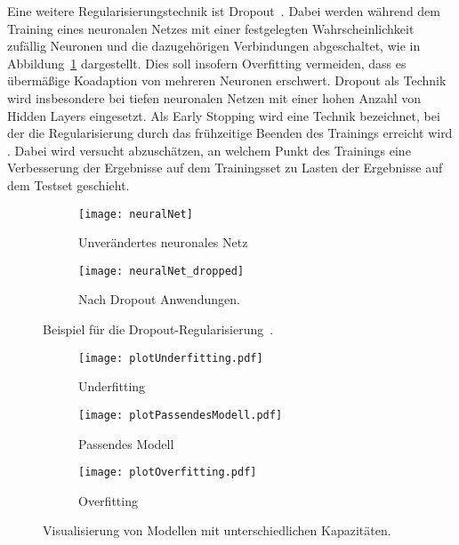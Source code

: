 
Eine weitere Regularisierungstechnik ist Dropout~\cite{JMLR:v15:srivastava14a}.
Dabei werden während dem Training eines neuronalen Netzes 
mit einer festgelegten Wahrscheinlichkeit zufällig Neuronen und die dazugehörigen Verbindungen abgeschaltet, 
wie in Abbildung~\ref{fig:dropout} dargestellt.
Dies soll insofern Overfitting vermeiden, dass es übermäßige Koadaption von mehreren Neuronen erschwert.
Dropout als Technik wird insbesondere bei tiefen neuronalen Netzen mit einer hohen Anzahl von Hidden Layers eingesetzt. 
Als Early Stopping wird eine Technik bezeichnet, bei der die Regularisierung durch das frühzeitige Beenden des Trainings erreicht wird \cite[Kapitel 7.8]{Goodfellow-et-al-2016}.
Dabei wird versucht abzuschätzen, an welchem Punkt des Trainings 
eine Verbesserung der Ergebnisse auf dem Trainingsset zu Lasten der Ergebnisse auf dem Testset geschieht.


\begin{figure}
    \centering
    \begin{subfigure}[t]{0.4\textwidth}
		\texttt{[image: neuralNet]}
		\caption{Unverändertes neuronales Netz}
    \end{subfigure}
    \begin{subfigure}[t]{0.4\textwidth}
		\texttt{[image: neuralNet\_dropped]}
		\caption{Nach Dropout Anwendungen.}
	\end{subfigure}
    \caption{Beispiel für die Dropout-Regularisierung~\cite{JMLR:v15:srivastava14a}.}
    \label{fig:dropout}
\end{figure}


\begin{figure}
    \centering
	
	\begin{subfigure}[t]{0.6\textwidth}
		\texttt{[image: plotUnderfitting.pdf]}
		\caption{Underfitting}
		\label{subfig:underfitting}
	\end{subfigure}
	\begin{subfigure}[t]{0.6\textwidth}
		\texttt{[image: plotPassendesModell.pdf]}
		\caption{Passendes Modell}
		\label{subfig:rightfitting}
	\end{subfigure}
	\begin{subfigure}[t]{0.6\textwidth}
        \texttt{[image: plotOverfitting.pdf]}
		\caption{Overfitting}
		\label{subfig:overfitting}
	\end{subfigure}
	\caption{Visualisierung von Modellen mit unterschiedlichen Kapazitäten.}
	\label{fig:capacity}
\end{figure}


